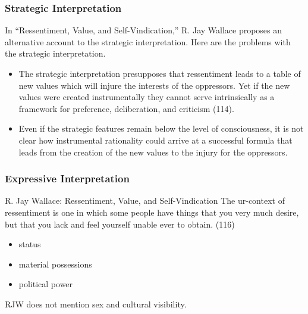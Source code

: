 \documentclass[xcolor=dvipsnames]{beamer}
\begin{document}

\begin{frame}
  \frametitle{Strategic Interpretation}
  In ``Ressentiment, Value, and Self-Vindication,'' R. Jay Wallace proposes an alternative account to the
  \alert{strategic interpretation}. Here are the problems with the
  strategic interpretation.
  \begin{itemize}
  \item The strategic interpretation presupposes that ressentiment
    leads to a table of new values which will injure the interests of
    the oppressors. Yet if the new values were created
    \alert{instrumentally} they cannot serve \alert{intrinsically} as
    a framework for preference, deliberation, and criticism (114).
  \item Even if the strategic features remain below the level of
    consciousness, it is not clear how instrumental rationality could
    arrive at a successful formula that leads from the creation of the
    new values to the injury for the oppressors.
  \end{itemize}
\end{frame}

\begin{frame}
  \frametitle{Expressive Interpretation}
  \begin{block}{R. Jay Wallace: Ressentiment, Value, and
      Self-Vindication}
    The ur-context of ressentiment is one in which some people have
    things that you very much desire, but that you lack and feel
    yourself unable ever to obtain. (116)
  \end{block}
  \begin{itemize}
  \item status
  \item material possessions
  \item political power
  \end{itemize}
  RJW does not mention sex and cultural visibility. 
\end{frame}
\end{document}
